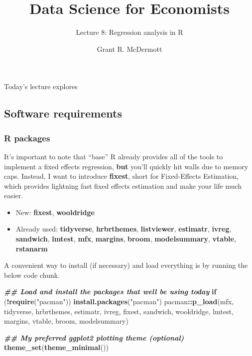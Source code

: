 \documentclass[
]{article}
\title{Data Science for Economists}
\subtitle{Lecture 8: Regression analysis in R}
\author[]{Grant R. McDermott}
\affil{University
of Oregon \textbar{} \href{https://github.com/uo-ec607/lectures}{EC
607}}
\date{}
\newenvironment{Shaded}{\begin{snugshade}}{\end{snugshade}}
\newcommand{\ControlFlowTok}[1]{\textcolor[rgb]{0.13,0.29,0.53}{\textbf{#1}}}
\newcommand{\DocumentationTok}[1]{\textcolor[rgb]{0.56,0.35,0.01}{\textbf{\textit{#1}}}}
\newcommand{\FunctionTok}[1]{\textcolor[rgb]{0.13,0.29,0.53}{\textbf{#1}}}
\newcommand{\NormalTok}[1]{#1}
\newcommand{\SpecialCharTok}[1]{\textcolor[rgb]{0.81,0.36,0.00}{\textbf{#1}}}
\newcommand{\StringTok}[1]{\textcolor[rgb]{0.31,0.60,0.02}{#1}}
\providecommand{\tightlist}{%
  \setlength{\itemsep}{0pt}\setlength{\parskip}{0pt}}
\begin{document}
\maketitle

{
\hypersetup{linkcolor=}
\setcounter{tocdepth}{2}
\tableofcontents
}
Today's lecture explores

\hypertarget{software-requirements}{%
\subsection{Software requirements}\label{software-requirements}}

\hypertarget{r-packages}{%
\subsubsection{R packages}\label{r-packages}}

It's important to note that ``base'' R already provides all of the tools
to implement a fixed effects regression, \textbf{but} you'll quickly hit
walls due to memory caps. Instead, I want to introduce \textbf{fixest},
short for Fixed-Effects Estimation, which provides lightning fast fixed
effects estimation and make your life much easier.

\begin{itemize}
\tightlist
\item
  New: \textbf{fixest}, \textbf{wooldridge}
\item
  Already used: \textbf{tidyverse}, \textbf{hrbrthemes},
  \textbf{listviewer}, \textbf{estimatr}, \textbf{ivreg},
  \textbf{sandwich}, \textbf{lmtest}, \textbf{mfx}, \textbf{margins},
  \textbf{broom}, \textbf{modelsummary}, \textbf{vtable},
  \textbf{rstanarm}
\end{itemize}

A convenient way to install (if necessary) and load everything is by
running the below code chunk.

\begin{Shaded}
\begin{Highlighting}[]
\DocumentationTok{\#\# Load and install the packages that we\textquotesingle{}ll be using today}
\ControlFlowTok{if}\NormalTok{ (}\SpecialCharTok{!}\FunctionTok{require}\NormalTok{(}\StringTok{"pacman"}\NormalTok{)) }\FunctionTok{install.packages}\NormalTok{(}\StringTok{"pacman"}\NormalTok{)}
\NormalTok{pacman}\SpecialCharTok{::}\FunctionTok{p\_load}\NormalTok{(mfx, tidyverse, hrbrthemes, estimatr, ivreg, fixest, sandwich, wooldridge,}
\NormalTok{               lmtest, margins, vtable, broom, modelsummary)}

\DocumentationTok{\#\# My preferred ggplot2 plotting theme (optional)}
\FunctionTok{theme\_set}\NormalTok{(}\FunctionTok{theme\_minimal}\NormalTok{())}
\end{Highlighting}
\end{Shaded}
\end{document}
